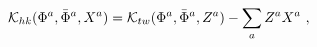 \begin{equation}
\label{Legendre}
{\cal K}_{hk}({\Phi}^a, {\bar \Phi}^a, X^a) =
{\cal K}_{tw}({\Phi}^a, {\bar \Phi}^a, Z^a) - \sum_a Z^a X^a\ ,
   \end{equation}


